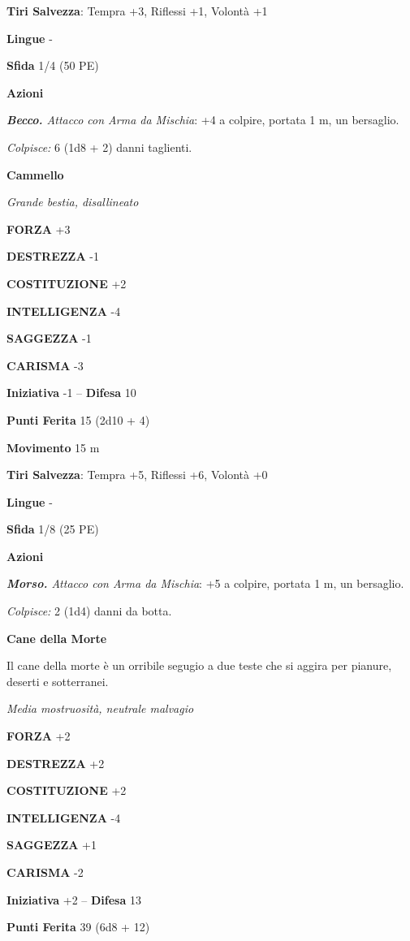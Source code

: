 \begin{multicols}{2}
\textbf{Tiri Salvezza}: Tempra +3, Riflessi +1, Volontà +1

\textbf{Lingue} -

\textbf{Sfida} 1/4 (50 PE)

\textbf{Azioni}

\emph{\textbf{Becco.} Attacco con Arma da Mischia}: +4 a colpire, portata 1 m, un bersaglio.

\emph{Colpisce:} 6 (1d8 + 2) danni taglienti.

\medskip\textbf{Cammello}

\emph{Grande bestia, disallineato}

\textbf{FORZA} +3

\textbf{DESTREZZA} -1

\textbf{COSTITUZIONE} +2

\textbf{INTELLIGENZA} -4

\textbf{SAGGEZZA} -1

\textbf{CARISMA} -3

\textbf{Iniziativa} -1 -- \textbf{Difesa} 10

\textbf{Punti Ferita} 15 (2d10 + 4)

\textbf{Movimento} 15 m

\textbf{Tiri Salvezza}: Tempra +5, Riflessi +6, Volontà +0 

\textbf{Lingue} -

\textbf{Sfida} 1/8 (25 PE)

\textbf{Azioni}

\emph{\textbf{Morso.} Attacco con Arma da Mischia}: +5 a colpire, portata 1 m, un bersaglio.

\emph{Colpisce:} 2 (1d4) danni da botta.

\medskip\textbf{Cane della Morte}

Il cane della morte è un orribile segugio a due teste che si aggira per pianure, deserti e sotterranei.

\emph{Media mostruosità, neutrale malvagio}

\textbf{FORZA} +2

\textbf{DESTREZZA} +2

\textbf{COSTITUZIONE} +2

\textbf{INTELLIGENZA} -4

\textbf{SAGGEZZA} +1

\textbf{CARISMA} -2

\textbf{Iniziativa} +2 -- \textbf{Difesa} 13

\textbf{Punti Ferita} 39 (6d8 + 12)


\end{multicols}
